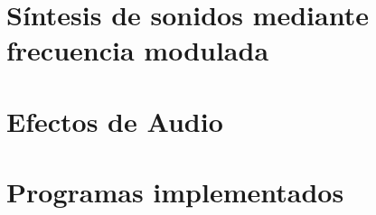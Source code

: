 







\tableofcontents
\newpage


%	
%		
%	
%	
\section{Síntesis de sonidos mediante frecuencia modulada}
	\label{Ejercicio-3}
	

\section{Efectos de Audio}
	\label{Ejercicio-6}
	


\section{Programas implementados}
	\label{Ejercicio-8}
	


